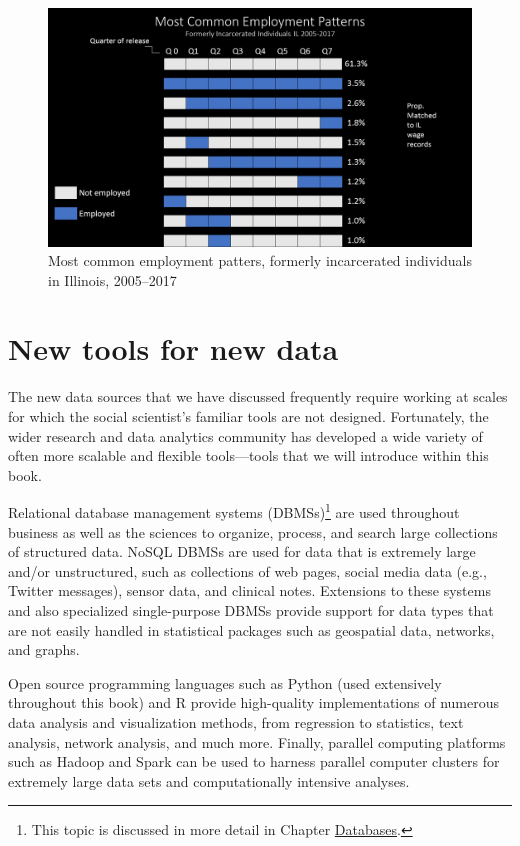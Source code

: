 \documentclass[]{krantz}
\begin{document}
\begin{figure}

{\centering \includegraphics[width=0.9\linewidth]{ChapterIntro/figures/patterns} 

}

\caption{Most common employment patters, formerly incarcerated individuals in Illinois, 2005--2017}\label{fig:patternfig}
\end{figure}

\hypertarget{sec:1-5}{\section{New tools for new data}\label{sec:1-5}}

The new data sources that we have discussed frequently require working
at scales for which the social scientist's familiar tools are not
designed. Fortunately, the wider research and data analytics community
has developed a wide variety of often more scalable and flexible
tools---tools that we will introduce within this book.

Relational database management systems (DBMSs)\footnote{This topic is
  discussed in more detail in Chapter
  \protect\hyperlink{chap:db}{Databases}.} are used throughout business
as well as the sciences to organize, process, and search large
collections of structured data. NoSQL DBMSs are used for data that is
extremely large and/or unstructured, such as collections of web pages,
social media data (e.g., Twitter messages), sensor data, and clinical
notes. Extensions to these systems and also specialized single-purpose
DBMSs provide support for data types that are not easily handled in
statistical packages such as geospatial data, networks, and graphs.

Open source programming languages such as Python (used extensively
throughout this book) and R provide high-quality implementations of
numerous data analysis and visualization methods, from regression to
statistics, text analysis, network analysis, and much more. Finally,
parallel computing platforms such as Hadoop and Spark can be used to
harness parallel computer clusters for extremely large data sets and
computationally intensive analyses.
\end{document}
